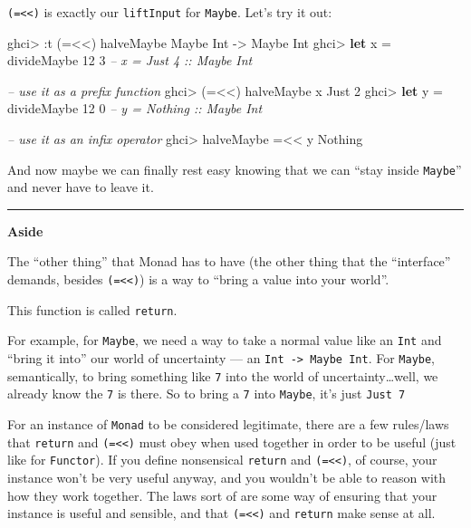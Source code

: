 \documentclass[]{article}
\newenvironment{Shaded}{}{}
\newcommand{\KeywordTok}[1]{\textcolor[rgb]{0.00,0.44,0.13}{\textbf{{#1}}}}
\newcommand{\DataTypeTok}[1]{\textcolor[rgb]{0.56,0.13,0.00}{{#1}}}
\newcommand{\DecValTok}[1]{\textcolor[rgb]{0.25,0.63,0.44}{{#1}}}
\newcommand{\CommentTok}[1]{\textcolor[rgb]{0.38,0.63,0.69}{\textit{{#1}}}}
\newcommand{\OtherTok}[1]{\textcolor[rgb]{0.00,0.44,0.13}{{#1}}}
\newcommand{\FunctionTok}[1]{\textcolor[rgb]{0.02,0.16,0.49}{{#1}}}
\newcommand{\NormalTok}[1]{{#1}}
\begin{document}
\texttt{(=\textless{}\textless{})} is exactly our \texttt{liftInput} for
\texttt{Maybe}. Let's try it out:

\begin{Shaded}
\begin{Highlighting}[]
\NormalTok{ghci}\FunctionTok{>} \FunctionTok{:}\NormalTok{t (}\FunctionTok{=<<}\NormalTok{) halveMaybe}
\DataTypeTok{Maybe} \DataTypeTok{Int} \OtherTok{->} \DataTypeTok{Maybe} \DataTypeTok{Int}
\NormalTok{ghci}\FunctionTok{>} \KeywordTok{let} \NormalTok{x }\FunctionTok{=} \NormalTok{divideMaybe }\DecValTok{12} \DecValTok{3}     \CommentTok{-- x = Just 4 :: Maybe Int}

\CommentTok{-- use it as a prefix function}
\NormalTok{ghci}\FunctionTok{>} \NormalTok{(}\FunctionTok{=<<}\NormalTok{) halveMaybe x}
\DataTypeTok{Just} \DecValTok{2}
\NormalTok{ghci}\FunctionTok{>} \KeywordTok{let} \NormalTok{y }\FunctionTok{=} \NormalTok{divideMaybe }\DecValTok{12} \DecValTok{0}     \CommentTok{-- y = Nothing :: Maybe Int}

\CommentTok{-- use it as an infix operator}
\NormalTok{ghci}\FunctionTok{>} \NormalTok{halveMaybe }\FunctionTok{=<<} \NormalTok{y}
\DataTypeTok{Nothing}
\end{Highlighting}
\end{Shaded}

And now maybe we can finally rest easy knowing that we can ``stay inside
\texttt{Maybe}'' and never have to leave it.

\begin{center}\rule{0.5\linewidth}{\linethickness}\end{center}

\textbf{Aside}

The ``other thing'' that Monad has to have (the other thing that the
``interface'' demands, besides \texttt{(=\textless{}\textless{})}) is a
way to ``bring a value into your world''.

This function is called \texttt{return}.

For example, for \texttt{Maybe}, we need a way to take a normal value
like an \texttt{Int} and ``bring it into'' our world of uncertainty ---
an \texttt{Int\ -\textgreater{}\ Maybe\ Int}. For \texttt{Maybe},
semantically, to bring something like \texttt{7} into the world of
uncertainty\ldots{}well, we already know the \texttt{7} is there. So to
bring a \texttt{7} into \texttt{Maybe}, it's just \texttt{Just\ 7}

For an instance of \texttt{Monad} to be considered legitimate, there are
a few rules/laws that \texttt{return} and
\texttt{(=\textless{}\textless{})} must obey when used together in order
to be useful (just like for \texttt{Functor}). If you define nonsensical
\texttt{return} and \texttt{(=\textless{}\textless{})}, of course, your
instance won't be very useful anyway, and you wouldn't be able to reason
with how they work together. The laws sort of are some way of ensuring
that your instance is useful and sensible, and that
\texttt{(=\textless{}\textless{})} and \texttt{return} make sense at
all.
\end{document}
